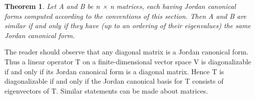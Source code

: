 \documentclass{article}
\theoremstyle{plain}
\newtheorem{theorem}{Theorem}[section]
\theoremstyle{plain} %
\begin{document}
\begin{theorem}
  Let A and B be n × n matrices, each having Jordan canonical forms computed according to the conventions of this section. Then A and B are similar if and only if they have (up to an ordering of their eigenvalues) the same Jordan canonical form.
\end{theorem}

The reader should observe that any diagonal matrix is a Jordan canonical form. Thus a linear operator T on a finite-dimensional vector space V is diagonalizable if and only if its Jordan canonical form is a diagonal matrix. Hence T is diagonalizable if and only if the Jordan canonical basis for T consists of eigenvectors of T. Similar statements can be made about matrices. 
\end{document}
